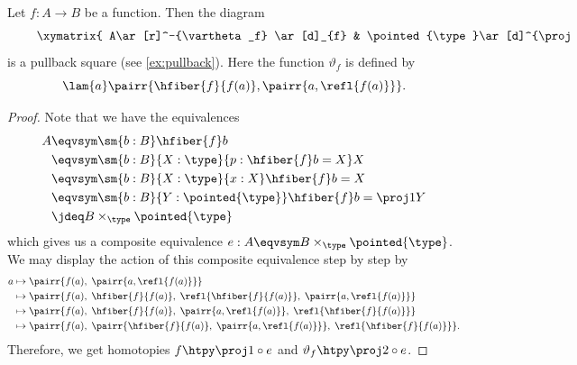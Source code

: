 %
\begin{thm}\label{thm:object-classifier}
Let $f:A\to B$ be a function. Then the diagram
\begin{equation*}
  \vcenter{\xymatrix{
      A\ar[r]^-{\vartheta_f} \ar[d]_{f} &
      \pointed{\type}\ar[d]^{\proj1}\\
      B\ar[r]_{\chi_f} &
      \type
      }}
\end{equation*}
is a pullback square (see \cref{ex:pullback}).
Here the function $\vartheta_f$ is defined by
\begin{equation*}
 \lam{a} \pairr{\hfiber{f}{f(a)},\pairr{a,\refl{f(a)}}}.
\end{equation*}
\end{thm}

\begin{proof}
Note that we have the equivalences
\begin{align*}
A & \eqvsym \sm{b:B} \hfiber{f}b\\
& \eqvsym \sm{b:B}{X:\type}{p:\hfiber{f}b= X} X\\
& \eqvsym \sm{b:B}{X:\type}{x:X} \hfiber{f}b= X\\
& \eqvsym \sm{b:B}{Y:\pointed{\type}} \hfiber{f}b = \proj1 Y\\
& \jdeq B\times_{\type}\pointed{\type}
\end{align*}
which gives us a composite equivalence $e:A\eqvsym B\times_\type\pointed{\type}$.
We may display the action of this composite equivalence step by step by
\begin{align*}
a & \mapsto \pairr{f(a),\; \pairr{a,\refl{f(a)}}}\\
& \mapsto \pairr{f(a), \; \hfiber{f}{f(a)}, \; \refl{\hfiber{f}{f(a)}}, \; \pairr{a,\refl{f(a)}}}\\
& \mapsto \pairr{f(a), \; \hfiber{f}{f(a)}, \; \pairr{a,\refl{f(a)}}, \; \refl{\hfiber{f}{f(a)}}}\\
& \mapsto \pairr{f(a), \; \pairr{\hfiber{f}{f(a)}, \; \pairr{a,\refl{f(a)}}}, \; \refl{\hfiber{f}{f(a)}}}.
\end{align*}
Therefore, we get homotopies $f\htpy\proj1\circ e$ and $\vartheta_f\htpy \proj2\circ e$.
\end{proof}
